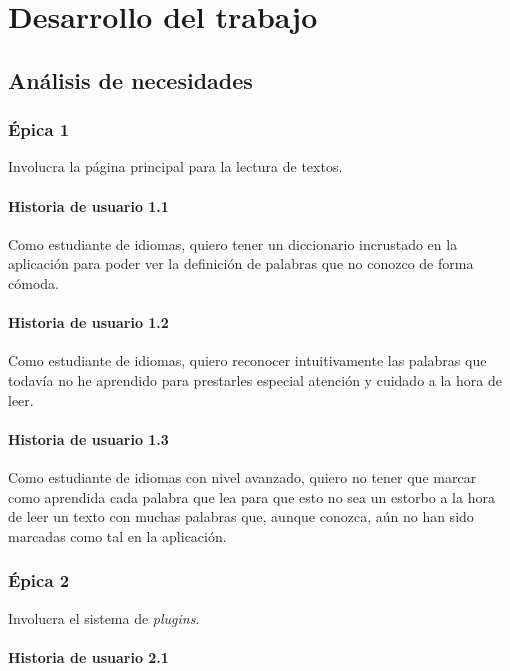 \chapter{Desarrollo del trabajo}  

\section{Análisis de necesidades}

\subsection{Épica 1}

Involucra la página principal para la lectura de textos.

\subsubsection{Historia de usuario 1.1}

Como estudiante de idiomas, quiero tener un diccionario incrustado en la aplicación para poder ver la definición de palabras que no conozco de forma cómoda.

\subsubsection{Historia de usuario 1.2}

Como estudiante de idiomas, quiero reconocer intuitivamente las palabras que todavía no he aprendido para prestarles especial atención y cuidado a la hora de leer.

\subsubsection{Historia de usuario 1.3}

Como estudiante de idiomas con nivel avanzado, quiero no tener que marcar como aprendida cada palabra que lea para que esto no sea un estorbo a la hora de leer un texto con muchas palabras que, aunque conozca, aún no han sido marcadas como tal en la aplicación.

\subsection{Épica 2}

Involucra el sistema de \textit{plugins}.

\subsubsection{Historia de usuario 2.1}

